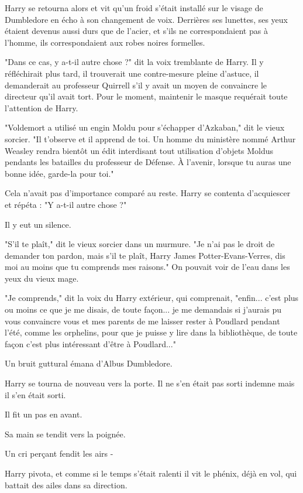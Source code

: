 Harry se retourna alors et vit qu'un froid s'était installé sur le visage de Dumbledore en écho à son changement de voix. Derrières ses lunettes, ses yeux étaient devenus aussi durs que de l'acier, et s'ils ne correspondaient pas à l'homme, ils correspondaient aux robes noires formelles.

"Dans ce cas, y a-t-il autre chose ?" dit la voix tremblante de Harry. Il y réfléchirait plus tard, il trouverait une contre-mesure pleine d'astuce, il demanderait au professeur Quirrell s'il y avait un moyen de convaincre le directeur qu'il avait tort. Pour le moment, maintenir le masque requérait toute l'attention de Harry.

"Voldemort a utilisé un engin Moldu pour s'échapper d'Azkaban," dit le vieux sorcier. "Il t'observe et il apprend de toi. Un homme du ministère nommé Arthur Weasley rendra bientôt un édit interdisant tout utilisation d'objets Moldus pendants les batailles du professeur de Défense. À l'avenir, lorsque tu auras une bonne idée, garde-la pour toi."

Cela n'avait pas d'importance comparé au reste. Harry se contenta d'acquiescer et répéta : "Y a-t-il autre chose ?"

Il y eut un silence.

"S'il te plaît," dit le vieux sorcier dans un murmure. "Je n'ai pas le droit de demander ton pardon, mais s'il te plaît, Harry James Potter-Evans-Verres, dis moi au moins que tu comprends mes raisons." On pouvait voir de l'eau dans les yeux du vieux mage.

"Je comprends," dit la voix du Harry extérieur, qui comprenait, "enfin... c'est plus ou moins ce que je me disais, de toute façon... je me demandais si j'aurais pu vous convaincre vous et mes parents de me laisser rester à Poudlard pendant l'été, comme les orphelins, pour que je puisse y lire dans la bibliothèque, de toute façon c'est plus intéressant d'être à Poudlard..."

Un bruit guttural émana d'Albus Dumbledore.

Harry se tourna de nouveau vers la porte. Il ne s'en était pas sorti indemne mais il s'en était sorti.

Il fit un pas en avant.

Sa main se tendit vers la poignée.

Un cri perçant fendit les airs -

Harry pivota, et comme si le temps s'était ralenti il vit le phénix, déjà en vol, qui battait des ailes dans sa direction.

